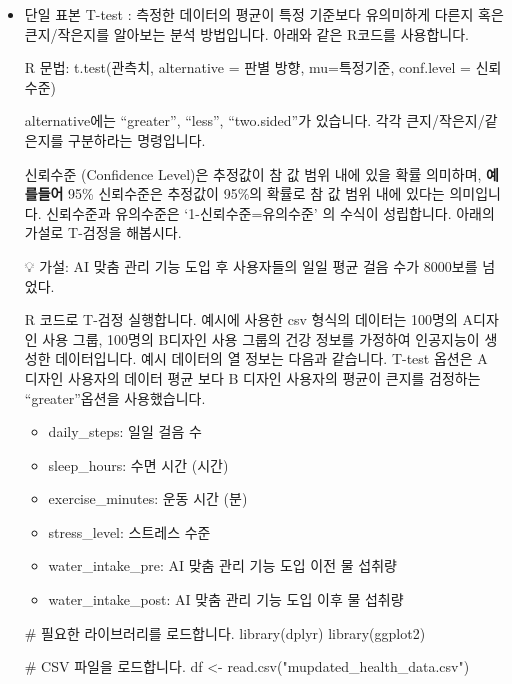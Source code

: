 \documentclass[
  letterpaper,
]{book}
\newenvironment{Shaded}{\begin{snugshade}}{\end{snugshade}}
\newcommand{\CommentTok}[1]{\textcolor[rgb]{0.37,0.37,0.37}{#1}}
\newcommand{\FunctionTok}[1]{\textcolor[rgb]{0.28,0.35,0.67}{#1}}
\newcommand{\NormalTok}[1]{\textcolor[rgb]{0.00,0.23,0.31}{#1}}
\newcommand{\OtherTok}[1]{\textcolor[rgb]{0.00,0.23,0.31}{#1}}
\newcommand{\StringTok}[1]{\textcolor[rgb]{0.13,0.47,0.30}{#1}}
\providecommand{\tightlist}{%
  \setlength{\itemsep}{0pt}\setlength{\parskip}{0pt}}\usepackage{longtable,booktabs,array}
\renewenvironment{Shaded}
    {\begin{snugshade}
    \begin{singlespace}
    \linespread{1}
    }
    {\end{singlespace}
    \end{snugshade}
}
\begin{document}
\begin{itemize}
\item
  단일 표본 T-test : 측정한 데이터의 평균이 특정 기준보다 유의미하게
  다른지 혹은 큰지/작은지를 알아보는 분석 방법입니다. 아래와 같은
  R코드를 사용합니다.

  R 문법: t.test(관측치, alternative = 판별 방향, mu=특정기준,
  conf.level = 신뢰수준)

  alternative에는 ``greater'', ``less'', ``two.sided''가 있습니다. 각각
  큰지/작은지/같은지를 구분하라는 명령입니다.

  신뢰수준 (Confidence Level)은 추정값이 참 값 범위 내에 있을 확률
  의미하며, \textbf{예를들어} 95\% 신뢰수준은 추정값이 95\%의 확률로 참
  값 범위 내에 있다는 의미입니다. 신뢰수준과 유의수준은
  `1-신뢰수준=유의수준' 의 수식이 성립합니다. 아래의 가설로 T-검정을
  해봅시다.

  💡 가설: AI 맞춤 관리 기능 도입 후 사용자들의 일일 평균 걸음 수가
  8000보를 넘었다.

  R 코드로 T-검정 실행합니다. 예시에 사용한 csv 형식의 데이터는 100명의
  A디자인 사용 그룹, 100명의 B디자인 사용 그룹의 건강 정보를 가정하여
  인공지능이 생성한 데이터입니다. 예시 데이터의 열 정보는 다음과
  같습니다. T-test 옵션은 A 디자인 사용자의 데이터 평균 보다 B 디자인
  사용자의 평균이 큰지를 검정하는 ``greater''옵션을 사용했습니다.

  \begin{itemize}
  \tightlist
  \item
    daily\_steps: 일일 걸음 수
  \item
    sleep\_hours: 수면 시간 (시간)
  \item
    exercise\_minutes: 운동 시간 (분)
  \item
    stress\_level: 스트레스 수준
  \item
    water\_intake\_pre: AI 맞춤 관리 기능 도입 이전 물 섭취량
  \item
    water\_intake\_post: AI 맞춤 관리 기능 도입 이후 물 섭취량
  \end{itemize}

\begin{Shaded}
\begin{Highlighting}[]
\CommentTok{\# 필요한 라이브러리를 로드합니다.}
\FunctionTok{library}\NormalTok{(dplyr)}
\FunctionTok{library}\NormalTok{(ggplot2)}

\CommentTok{\# CSV 파일을 로드합니다.}
\NormalTok{df }\OtherTok{\textless{}{-}} \FunctionTok{read.csv}\NormalTok{(}\StringTok{"mupdated\_health\_data.csv"}\NormalTok{)}


\end{Highlighting}
\end{Shaded}
\end{itemize}
\end{document}
